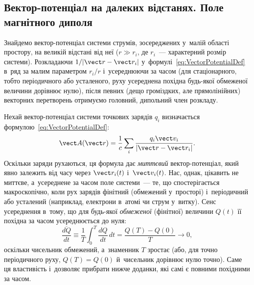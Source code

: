 \subsection*{Вектор-потенціал на далеких відстанях. Поле магнітного диполя}


Знайдемо вектор-потенціал системи струмів, зосереджених у~малій області простору, на
великій відстані від неї ($r \gg r_i$, де $r_i$~--- характерний розмір системи).
Розкладаючи $1/|\vect r - \vect r_i|$ у~формулі~\eqref{eq:VectorPotentialDef} в~ряд за
малим параметром $r_i/r$ і~усереднюючи за часом (для стаціонарного, тобто періодичного або
усталеного, руху усереднена похідна будь-якої обмеженої величини дорівнює нулю), після
певних (дещо громіздких, але прямолінійних) векторних перетворень отримуємо головний,
дипольний член розкладу.

Нехай вектор-потенціал системи точкових зарядів $q_i$ визначається
формулою~\eqref{eq:VectorPotentialDef}:
\begin{equation*}
	\vect A(\vect r) = \frac{1}{c}\sum_i \frac{q_i\vect v_i}{|\vect r - \vect r_i|}.
\end{equation*}
Оскільки заряди рухаються, ця формула дає \emph{миттєвий} вектор-по\-тен\-ці\-ал, який
явно залежить від часу через $\vect r_i(t)$ і~$\vect v_i(t)$. Нас, однак, цікавить не
миттєве, а~усереднене за часом поле системи~--- те, що спостерігається макроскопічно, коли
рух зарядів фінітний (обмежений у~просторі) і~періодичний або усталений (наприклад,
електрони в~атомі чи струм у~витку). Сенс усереднення в~тому, що для будь-якої
\emph{обмеженої} (фінітної) величини $Q(t)$ її похідна за часом усереднюється до нуля:
\begin{equation}\label{eq:AveragedDerivativeZero}
	\overline{\frac{dQ}{dt}} \equiv \frac{1}{T}\int_0^T \frac{dQ}{dt}\,dt = \frac{Q(T)-Q(0)}{T} \to 0,
\end{equation}
оскільки чисельник обмежений, а~знаменник $T$ зростає (або, для точно періодичного руху,
$Q(T)=Q(0)$ й~чисельник дорівнює нулю точно). Саме ця властивість і~дозволяє прибрати
нижче доданки, які самі є повними похідними за часом.


